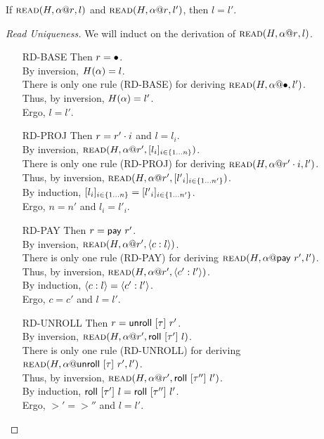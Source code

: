 \begin{lem}
  If $\textsc{read}({H},{{\alpha}@{r}},{l})$ and $\textsc{read}({H},{{\alpha}@{r}},{l'})$, then $l = l'$.
\end{lem}

\begin{proof}[Read Uniqueness]
  We will induct on the derivation of $\textsc{read}({H},{{\alpha}@{r}},{l})$.
  \begin{itemize}
    \item[\textsc{RD-BASE}] Then $r = \bullet$. \\
      By inversion, $H(\alpha)=l$. \\
      There is only one rule (\textsc{RD-BASE}) for deriving $\textsc{read}({H},{{\alpha}@{\bullet}},{l'})$. \\
      Thus, by inversion, $H(\alpha)=l'$. \\
      Ergo, $l = l'$.
    \item[\textsc{RD-PROJ}] Then $r = {r'}\cdot{i}$ and $l = l_i$. \\
      By inversion, $\textsc{read}({H},{{\alpha}@{r'}},{[{{l}_{i}}]_{{i} \in \{1 \ldots {n}\} }})$. \\
      There is only one rule (\textsc{RD-PROJ}) for
      deriving $\textsc{read}({H},{{\alpha}@{{r'}\cdot{i}}},{l'})$. \\
      Thus, by inversion, $\textsc{read}({H},{{\alpha}@{r'}},{[{{l'}_{i}}]_{{i} \in \{1 \ldots {n'}\} }})$. \\
      By induction, $[{{l}_{i}}]_{{i} \in \{1 \ldots {n}\} } = [{{l'}_{i}}]_{{i} \in \{1 \ldots {n'}\} }$. \\
      Ergo, $n = n'$ and $l_i = l'_i$.
    \item[\textsc{RD-PAY}] Then $r = \mathsf{pay}~{r'}$. \\
      By inversion, $\textsc{read}({H},{{\alpha}@{r'}},{\langle{{c}:{l}}\rangle})$. \\
      There is only one rule (\textsc{RD-PAY}) for deriving $\textsc{read}({H},{{\alpha}@{\mathsf{pay}~{r'}}},{l'})$. \\
      Thus, by inversion, $\textsc{read}({H},{{\alpha}@{r'}},{\langle{{c'}:{l'}}\rangle})$. \\
      By induction, $\langle{{c}:{l}}\rangle = \langle{{c'}:{l'}}\rangle$. \\
      Ergo, $c = c'$ and $l = l'$.
    \item[\textsc{RD-UNROLL}] Then $r = \mathsf{unroll}~[{\tau}]~{r'}$. \\
      By inversion, $\textsc{read}({H},{{\alpha}@{r'}},{\mathsf{roll}~[{\tau'}]~{l}})$. \\
      There is only one rule (\textsc{RD-UNROLL}) for
      deriving $\textsc{read}({H},{{\alpha}@{\mathsf{unroll}~[{\tau}]~{r'}}},{l'})$. \\
      Thus, by inversion, $\textsc{read}({H},{{\alpha}@{r'}},{\mathsf{roll}~[{\tau''}]~{l'}})$. \\
      By induction, $\mathsf{roll}~[{\tau'}]~{l} = \mathsf{roll}~[{\tau''}]~{l'}$. \\
      Ergo, $\gt' = \gt''$ and $l = l'$.
  \end{itemize}
\end{proof}

